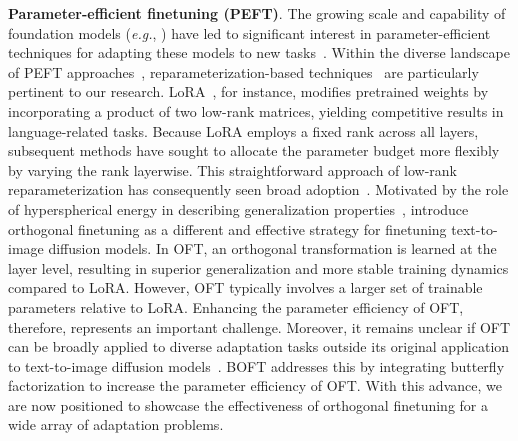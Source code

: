 \textbf{Parameter-efficient finetuning (PEFT)}. The growing scale and capability of foundation models (\emph{e.g.}, \cite{brown2020language,radford2021learning,rombach2022high,kirillov2023segment}) have led to significant interest in parameter-efficient techniques for adapting these models to new tasks~\cite{treviso2023efficient,ding2023parameter,lialin2023scaling}. Within the diverse landscape of PEFT approaches~\cite{houlsby2019parameter,aghajanyan2020intrinsic,hulora2022,edalati2022krona,wang2022adamix,gheini2021cross,zaken2022bitfit,guo2020parameter,sung2021training,ansell2022composable,lester2021power,li2021prefix,vu2022spot,he2021towards,mao2021unipelt,karimi2021compacter,liu2022few,sung2022lst,chen2022parameter,jia2022visual,chen2022adaptformer,zhang2022neural,jie2023fact,lian2022scaling,luo2023towards}, reparameterization-based techniques~\cite{aghajanyan2020intrinsic,hulora2022,edalati2022krona} are particularly pertinent to our research. LoRA~\cite{hulora2022}, for instance, modifies pretrained weights by incorporating a product of two low-rank matrices, yielding competitive results in language-related tasks. Because LoRA employs a fixed rank across all layers, subsequent methods \cite{zhang2022adaptive,valipour2022dylora,zhang2023increlora} have sought to allocate the parameter budget more flexibly by varying the rank layerwise. This straightforward approach of low-rank reparameterization has consequently seen broad adoption~\cite{dettmers2023qlora,zi2023delta,chavan2023one}. Motivated by the role of hyperspherical energy in describing generalization properties~\cite{liu2018learning,liu2021orthogonal}, \cite{qiu2023controlling} introduce orthogonal finetuning as a different and effective strategy for finetuning text-to-image diffusion models. In OFT, an orthogonal transformation is learned at the layer level, resulting in superior generalization and more stable training dynamics compared to LoRA. However, OFT typically involves a larger set of trainable parameters relative to LoRA. Enhancing the parameter efficiency of OFT, therefore, represents an important challenge. Moreover, it remains unclear if OFT can be broadly applied to diverse adaptation tasks outside its original application to text-to-image diffusion models~\cite{qiu2023controlling}. BOFT addresses this by integrating butterfly factorization to increase the parameter efficiency of OFT. With this advance, we are now positioned to showcase the effectiveness of orthogonal finetuning for a wide array of adaptation problems.

